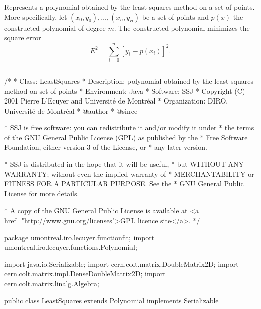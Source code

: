 
Represents a polynomial obtained by the least squares method on a set of points.
More specifically, let $(x_0,y_0), \ldots, (x_n, y_n)$ be a set of points and
$p(x)$ the constructed polynomial of degree $m$. The constructed polynomial
minimizes the square error \[ E^2=\sum_{i=0}^n [y_i - p(x_i)]^2.\]

\bigskip\hrule

\begin{code}
\begin{hide}
/*
 * Class:        LeastSquares
 * Description:  polynomial obtained by the least squares method on set of points
 * Environment:  Java
 * Software:     SSJ 
 * Copyright (C) 2001  Pierre L'Ecuyer and Université de Montréal
 * Organization: DIRO, Université de Montréal
 * @author       
 * @since

 * SSJ is free software: you can redistribute it and/or modify it under
 * the terms of the GNU General Public License (GPL) as published by the
 * Free Software Foundation, either version 3 of the License, or
 * any later version.

 * SSJ is distributed in the hope that it will be useful,
 * but WITHOUT ANY WARRANTY; without even the implied warranty of
 * MERCHANTABILITY or FITNESS FOR A PARTICULAR PURPOSE.  See the
 * GNU General Public License for more details.

 * A copy of the GNU General Public License is available at
   <a href="http://www.gnu.org/licenses">GPL licence site</a>.
 */
\end{hide}
package umontreal.iro.lecuyer.functionfit;
   import umontreal.iro.lecuyer.functions.Polynomial;
\begin{hide}

import java.io.Serializable;
import cern.colt.matrix.DoubleMatrix2D;
import cern.colt.matrix.impl.DenseDoubleMatrix2D;
import cern.colt.matrix.linalg.Algebra;
\end{hide}

public class LeastSquares extends Polynomial implements Serializable\begin{hide} {
   private static final long serialVersionUID = -4997132164503234983L;
   private static final Algebra alg = new Algebra ();
   private double[] x;
   private double[] y;
\end{hide}
\end{code}

